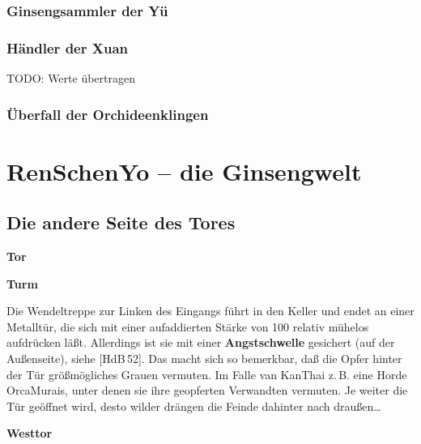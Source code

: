 \documentclass[
a4paper,
twoside,
DIV=calc,
BCOR=4mm,
fontsize=9pt,
twocolumn=on,
titlepage=on,
parskip=half
]{scrartcl}
\begin{document}
\subsubsection{Ginsengsammler der Yü}


\subsubsection{Händler der Xuan}

TODO: Werte übertragen

\subsubsection{Überfall der Orchideenklingen}

\section{RenSchenYo -- die Ginsengwelt}


\subsection{Die andere Seite des Tores}

\textbf{ Tor}


\textbf{ Turm}



Die Wendeltreppe zur Linken des Eingangs führt in den Keller und endet
an einer Metalltür, die sich mit einer aufaddierten Stärke von
100 relativ mühelos aufdrücken läßt. Allerdings ist sie mit einer
\textbf{Angstschwelle} gesichert (auf der Außenseite), siehe
[HdB\,52]. Das macht sich so bemerkbar, daß die Opfer hinter der Tür
größmögliches Grauen vermuten. Im Falle van KanThai z.\,B. eine Horde
OrcaMurais, unter denen sie ihre geopferten Verwandten vermuten. Je
weiter die Tür geöffnet wird, desto wilder drängen die Feinde dahinter
nach draußen\dots


\textbf{ Westtor}

\end{document}

